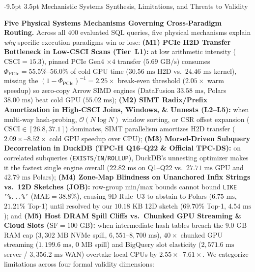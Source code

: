 \documentclass[10pt,a4paper]{article}
\makeatletter
\renewcommand\section{\@startsection{section}{1}{\z@}%
  {-9.5pt \@plus -2pt \@minus -1.5pt}%
  {3.5pt \@plus 1pt}%
  {\normalfont\large\bfseries}}
\makeatother
\begin{document}
\section{Mechanistic Systems Synthesis, Limitations, and Threats to Validity}
\enlargethispage{1.5\baselineskip}
\vspace{-3pt}
\par\noindent\textbf{Five Physical Systems Mechanisms Governing Cross-Paradigm Routing.} Across all $400$ evaluated SQL queries, five physical mechanisms explain \emph{why} specific execution paradigms win or lose: \textbf{(M1) PCIe H2D Transfer Bottleneck in Low-CSCI Scans (Tier~L1):} at low arithmetic intensity ($\text{CSCI}=15.3$), pinned PCIe Gen4 $\times 4$ transfer ($5.69\text{ GB/s}$) consumes $\Phi_{\text{PCIe}}=55.5\%\text{--}56.0\%$ of cold GPU time ($30.56\text{ ms}$ H2D vs.\ $24.46\text{ ms}$ kernel), missing the $(1-\Phi_{\text{PCIe}})^{-1}=2.25\times$ break-even threshold ($2.05\times$ warm speedup) so zero-copy Arrow SIMD engines (DataFusion $33.58\text{ ms}$, Polars $38.00\text{ ms}$) beat cold GPU ($55.02\text{ ms}$); \textbf{(M2) SIMT Radix/Prefix Amortization in High-CSCI Joins, Windows, \& Unnests (L2--L5):} when multi-way hash-probing, $\mathcal{O}(N\log N)$ window sorting, or CSR offset expansion ($\text{CSCI}\in[26.8,37.1]$) dominates, SIMT parallelism amortizes H2D transfer ($2.09\times\text{--}8.52\times$ cold GPU speedup over CPU); \textbf{(M3) Morsel-Driven Subquery Decorrelation in DuckDB (TPC-H Q16--Q22 \& Official TPC-DS):} on correlated subqueries (\texttt{EXISTS}/\texttt{IN}/\texttt{ROLLUP}), DuckDB's unnesting optimizer makes it the fastest single engine overall ($22.82\text{ ms}$ on Q1--Q22 vs.\ $27.71\text{ ms}$ GPU and $42.79\text{ ms}$ Polars); \textbf{(M4) Zone-Map Blindness on Unanchored Infix Strings vs.\ 12D Sketches (JOB):} row-group min/max bounds cannot bound \texttt{LIKE '\%...\%'} ($\text{MAE}=38.8\%$), causing 9D Rule~U3 to abstain to Polars ($6.75\text{ ms}$, $21.21\%$ Top-1) until resolved by our $10.18\text{ KB}$ 12D sketch ($69.70\%$ Top-1, $4.54\text{ ms}$); and \textbf{(M5) Host DRAM Spill Cliffs vs.\ Chunked GPU Streaming \& Cloud Slots ($\text{SF}=100\text{ GB}$):} when intermediate hash tables breach the $9.0\text{ GB}$ RAM cap ($3{,}302\text{ MB}$ NVMe spill, $6{,}551\text{--}8{,}700\text{ ms}$), $40\times$ chunked GPU streaming ($1{,}199.6\text{ ms}$, $0\text{ MB}$ spill) and BigQuery slot elasticity ($2{,}571.6\text{ ms}$ server / $3{,}356.2\text{ ms}$ WAN) overtake local CPUs by $2.55\times\text{--}7.61\times$. We categorize limitations across four formal validity dimensions:
\end{document}
